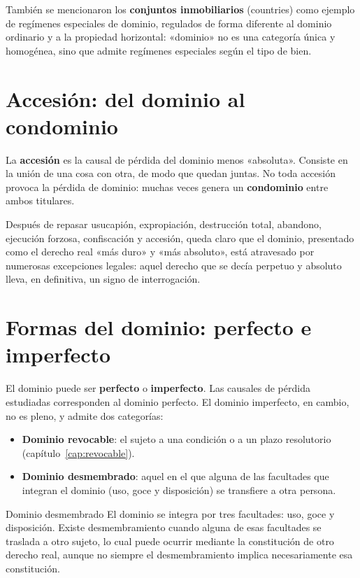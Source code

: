 \documentclass[12pt,oneside]{book}
\begin{document}
También se mencionaron los \textbf{conjuntos inmobiliarios} (countries) como ejemplo de regímenes especiales de dominio, regulados de forma diferente al dominio ordinario y a la propiedad horizontal: «dominio» no es una categoría única y homogénea, sino que admite regímenes especiales según el tipo de bien.

\section{Accesión: del dominio al condominio}
\label{sec:accesion}

La \textbf{accesión} es la causal de pérdida del dominio menos «absoluta». Consiste en la unión de una cosa con otra, de modo que quedan juntas. No toda accesión provoca la pérdida de dominio: muchas veces genera un \textbf{condominio} entre ambos titulares.

Después de repasar usucapión, expropiación, destrucción total, abandono, ejecución forzosa, confiscación y accesión, queda claro que el dominio, presentado como el derecho real «más duro» y «más absoluto», está atravesado por numerosas excepciones legales: aquel derecho que se decía perpetuo y absoluto lleva, en definitiva, un signo de interrogación.

\section{Formas del dominio: perfecto e imperfecto}
\label{sec:formas}

El dominio puede ser \textbf{perfecto} o \textbf{imperfecto}. Las causales de pérdida estudiadas corresponden al dominio perfecto. El dominio imperfecto, en cambio, no es pleno, y admite dos categorías:

\begin{itemize}
    \item \textbf{Dominio revocable}: el sujeto a una condición o a un plazo resolutorio (capítulo~\ref{cap:revocable}).
    \item \textbf{Dominio desmembrado}: aquel en el que alguna de las facultades que integran el dominio (uso, goce y disposición) se transfiere a otra persona.
\end{itemize}

\begin{definition}{Dominio desmembrado}
El dominio se integra por tres facultades: uso, goce y disposición. Existe desmembramiento cuando alguna de esas facultades se traslada a otro sujeto, lo cual puede ocurrir mediante la constitución de otro derecho real, aunque no siempre el desmembramiento implica necesariamente esa constitución.
\end{definition}
\end{document}
